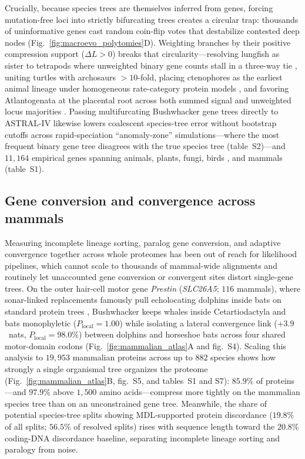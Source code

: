 \documentclass[12pt]{article}
\begin{document}
Crucially, because species trees are themselves inferred from genes, forcing mutation-free loci into strictly bifurcating trees creates a circular trap: thousands of uninformative genes cast random coin-flip votes that destabilize contested deep nodes \cite{shen2017contentious} (Fig.~\ref{fig:macroevo_polytomies}D). Weighting branches by their positive compression support ($\Delta L > 0$) breaks that circularity---resolving lungfish as sister to tetrapods where unweighted binary gene counts stall in a three-way tie \cite{chen2015identifying}, uniting turtles with archosaurs $>10$-fold, placing ctenophores as the earliest animal lineage under homogeneous rate-category protein models \cite{borowiec2015extracting,whelan2017ctenophore}, and favoring Atlantogenata at the placental root across both summed signal and unweighted locus majorities \cite{song2012resolving}. Passing multifurcating Bushwhacker gene trees directly to ASTRAL-IV \cite{zhang2025aster} likewise lowers coalescent species-tree error without bootstrap cutoffs across rapid-speciation ``anomaly-zone'' simulations---where the most frequent binary gene tree disagrees with the true species tree (table~S2)---and $11,164$ empirical genes spanning animals, plants, fungi, birds \cite{shultz2019widespread}, and mammals (table~S1).

\subsection*{Gene conversion and convergence across mammals}

Measuring incomplete lineage sorting, paralog gene conversion, and adaptive convergence together across whole proteomes has been out of reach for likelihood pipelines, which cannot scale to thousands of mammal-wide alignments and routinely let unaccounted gene conversion or convergent sites distort single-gene trees. On the outer hair-cell motor gene \textit{Prestin} (\textit{SLC26A5}; $116$ mammals), where sonar-linked replacements famously pull echolocating dolphins inside bats on standard protein trees \cite{liu2010convergent}, Bushwhacker keeps whales inside Cetartiodactyla and bats monophyletic ($P_{\mathrm{local}} = 1.00$) while isolating a lateral convergence link ($+3.9$~nats, $P_{\mathrm{local}} = 98.0\%$) between dolphins and horseshoe bats across four shared motor-domain codons (Fig.~\ref{fig:mammalian_atlas}A and fig.~S4). Scaling this analysis to $19,953$ mammalian proteins across up to $882$ species \cite{malovichko2026toga2} shows how strongly a single organismal tree organizes the proteome (Fig.~\ref{fig:mammalian_atlas}B, fig.~S5, and tables~S1 and S7): $85.9\%$ of proteins---and $97.9\%$ above $1,500$ amino acids---compress more tightly on the mammalian species tree than on an unconstrained gene tree. Meanwhile, the share of potential species-tree splits showing MDL-supported protein discordance ($19.8\%$ of all splits; $56.5\%$ of resolved splits) rises with sequence length toward the $20.8\%$ coding-DNA discordance baseline, separating incomplete lineage sorting and paralogy from noise.
\end{document}
